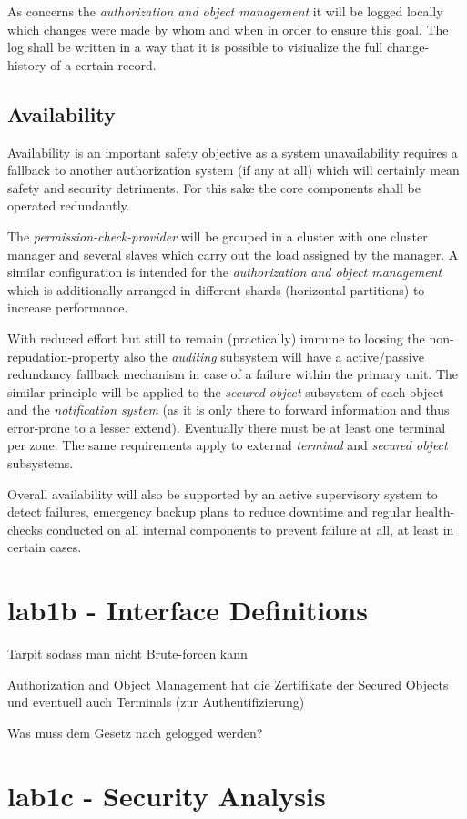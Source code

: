 \documentclass[12pt,a4paper,titlepage,oneside]{scrartcl}
\begin{document}
As concerns the \emph{authorization and object management} it will be logged locally which changes were made by whom and when in
order to ensure this goal. The log shall be written in a way that it is possible to visiualize the full change-history of a
certain record.


\subsection{Availability}
Availability is an important safety objective as a system unavailability requires a fallback to another authorization system (if any at all)
which will certainly mean safety and security detriments. For this sake the core components shall be operated redundantly.

The \emph{permission-check-provider} will be grouped in a cluster with one cluster manager and several slaves which carry
out the load assigned by the manager. A similar configuration is intended for the \emph{authorization and object management} 
which is additionally arranged in different shards (horizontal partitions) to increase performance.

With reduced effort but still to remain (practically) immune to loosing the non-repudation-property also the \emph{auditing} subsystem
will have a active/passive redundancy fallback mechanism in case of a failure within the primary unit. The similar principle
will be applied to the \emph{secured object} subsystem of each object and the \emph{notification system} (as it is only there
to forward information and thus error-prone to a lesser extend). Eventually there must be at least one terminal per zone. The same
requirements apply to external \emph{terminal} and \emph{secured object} subsystems.

Overall availability will also be supported by an active supervisory system to detect failures, emergency backup plans to reduce downtime
and regular health-checks conducted on all internal components to prevent failure at all, at least in certain cases.


\section{lab1b - Interface Definitions}

Tarpit sodass man nicht Brute-forcen kann

Authorization and Object Management hat die Zertifikate der Secured Objects und eventuell auch Terminals (zur Authentifizierung)

Was muss dem Gesetz nach gelogged werden?


\section{lab1c - Security Analysis}


%
%
\end{document}
